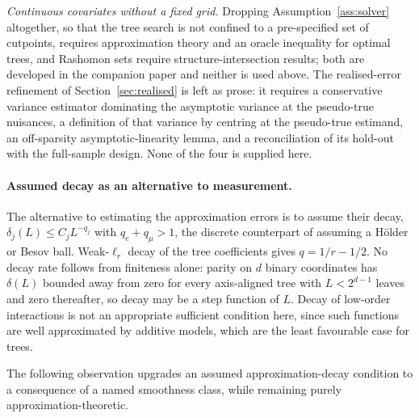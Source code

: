\documentclass[11pt]{article}
\theoremstyle{plain}
\theoremstyle{definition}
\theoremstyle{remark}
\begin{document}
\emph{Continuous covariates without a fixed grid.} Dropping
Assumption~\ref{ass:solver} altogether, so that the tree search is not
confined to a pre-specified set of cutpoints, requires approximation theory
and an oracle inequality for optimal trees, and Rashomon sets require
structure-intersection results; both are developed in the companion paper
and neither is used above. The realised-error refinement of
Section~\ref{sec:realised} is left as prose: it requires a conservative
variance estimator dominating the asymptotic variance at the pseudo-true
nuisances, a definition of that variance by centring at the pseudo-true
estimand, an off-sparsity asymptotic-linearity lemma, and a reconciliation of
its hold-out with the full-sample design. None of the four is supplied here.

\paragraph{Assumed decay as an alternative to measurement.}
The alternative to estimating the approximation errors is to assume their decay,
$\delta_j(L)\le C_jL^{-q_j}$ with $q_e+q_\mu>1$, the discrete counterpart of
assuming a Hölder or Besov ball. Weak-$\ell_r$ decay of the tree coefficients
gives $q=1/r-1/2$. No decay rate follows from finiteness alone: parity on $d$
binary coordinates has $\delta(L)$ bounded away from zero for every
axis-aligned tree with $L<2^{d-1}$ leaves and zero thereafter, so decay may be a
step function of $L$. Decay of low-order interactions is not an appropriate
sufficient condition here, since such functions are well approximated by
additive models, which are the least favourable case for trees.

The following observation upgrades an assumed approximation-decay condition to
a consequence of a named smoothness class, while remaining purely
approximation-theoretic.
\end{document}
